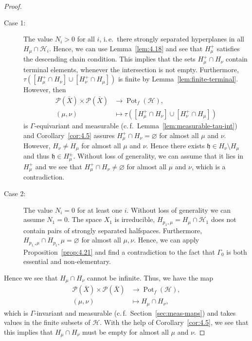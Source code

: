 \begin{proof}
\begin{description}
    \begin{description}
    \item[Case 1:] The value \(N_i > 0\) for all \(i\), i.\,e.\ there strongly separated hyperplanes in all \(H_\mu \cap \mathcal{H}_i\). Hence, we can use Lemma~\ref{lem:4.18} and see that \(H_\mu^+\) satisfies the descending chain condition. This implies that the sets \(H_\mu^+ \cap H_\nu\) contain terminal elements, whenever the intersection is not empty. Furthermore, \(\tau([H_\mu^+ \cap H_\nu] \cup [H_\nu^+ \cap H_\mu])\) is finite by Lemma~\ref{lem:finite-terminal}. However, then
      \begin{align*}
        \mathcal{P}(\bar X) \times \mathcal{P}(\bar X) &\to \operatorname{Pot}_f(\mathcal{H}),\\
        (\mu,\nu) &\mapsto \tau([H_\mu^+ \cap H_\nu] \cup [H_\nu^+ \cap H_\mu])
      \end{align*}
      is \(\Gamma\)-equivariant and measurable (c.\,f.\ Lemma~\ref{lem:measurable-tau-int}) and Corollary~\ref{cor:4.5} assures \(H_\mu^+ \cap H_\nu = \varnothing\) for almost all \(\mu\) and \(\nu\). However, \(H_\nu \neq H_\mu\) for almost all \(\mu\) and \(\nu\). Hence there exists \(\mathfrak{h} \in H_\nu \setminus H_\mu\) and thus \(\mathfrak{h} \in H_\mu^\pm\). Without loss of generality, we can assume that it lies in \(H_\mu^+\) and we see that \(H_\mu^+ \cap H_\nu \neq \varnothing\) for almost all \(\mu\) and \(\nu\), which is a contradiction.
    \item[Case 2:] The value \(N_i = 0\) for at least one \(i\). Without loss of generality we can assume \(N_1 = 0\). The space \(X_1\) is irreducible, \(H_{p_{1\ast}\mu} = H_\mu \cap \mathcal{H}_1\) does not contain pairs of strongly separated halfspaces. Furthermore, \(H_{p_{1,\ast}\mu} \cap H_{p_{1\ast}}\mu = \varnothing\) for almost all \(\mu, \nu\). Hence, we can apply Proposition~\ref{prop:4.21} and find a contradiction to the fact that \(\Gamma_0\) is both essential and non-elementary.
    \end{description}
  \end{description}
  Hence we see that \(H_\mu \cap H_\nu\) cannot be infinite. Thus, we have the map
  \begin{align*}
    \mathcal{P}(\bar X) \times \mathcal{P}(\bar X) & \to \operatorname{Pot}_f(\mathcal{H}),\\
    (\mu,\nu) &\mapsto H_\mu \cap H_\nu,
  \end{align*}
  which is \(\Gamma\)-invariant and measurable (c.\,f.~Section~\ref{sec:meas-maps}) and takes values in the finite subsets of \(\mathcal{H}\). With the help of Corollary~\ref{cor:4.5}, we see that this implies that \(H_\mu \cap H_\nu\) must be empty for almost all \(\mu\) and \(\nu\).


\end{proof}
